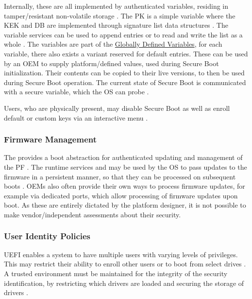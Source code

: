 Internally, these are all implemented by authenticated variables, residing in tamper\-/resistant non-volatile storage \cite[Section 32.3]{uefi-spec}.
The \ac{PK} is a simple variable where the \ac{KEK} and \ac{DB} are implemented through signature list data structures \cite[Section 32.4.1]{uefi-spec}.
The variable services can be used to append entries or to read and write the list as a whole \cite[Sections 32.3.5 and 32.5.3]{uefi-spec}.
The variables are part of the \hyperref[sec:uefi-pi:uefi:variables]{Globally Defined Variables}, for each variable, there also exists a variant reserved for default entries.
These can be used by an \ac{OEM} to supply platform\-/defined values, used during Secure Boot initialization.
Their contents can be copied to their live versions, to then be used during Secure Boot operation.
The current state of Secure Boot is communicated with a secure variable, which the \ac{OS} can probe \cite[Section 3.3]{uefi-spec}.

Users, who are physically present, may disable Secure Boot as well as enroll default or custom keys via an interactive menu \cite[Section 3.3]{uefi-spec}.

\subsubsection{Firmware Management}

The  provides a boot abstraction for authenticated updating and management of the \ac{PF} \cite[Section 23]{uefi-spec}.
The runtime services  and  may be used by the \ac{OS} to pass updates to the firmware in a persistent manner, so that they can be processed on subsequent boots \cite[Section 23.3]{uefi-spec}.
\acp{OEM} also often provide their own ways to process firmware updates, for example via dedicated  ports, which allow processing of firmware updates upon boot.
As these are entirely dictated by the platform designer, it is not possible to make vendor\-/independent assessments about their security.

\subsubsection{User Identity Policies}

\ac{UEFI} enables a system to have multiple users with varying levels of privileges.
This may restrict their ability to enroll other users or to boot from select drives \cite[Section 36.1.2]{uefi-spec}.
A trusted environment must be maintained for the integrity of the security identification, by restricting which drivers are loaded and securing the storage of drivers \cite[Section 36.1.4]{uefi-spec}.